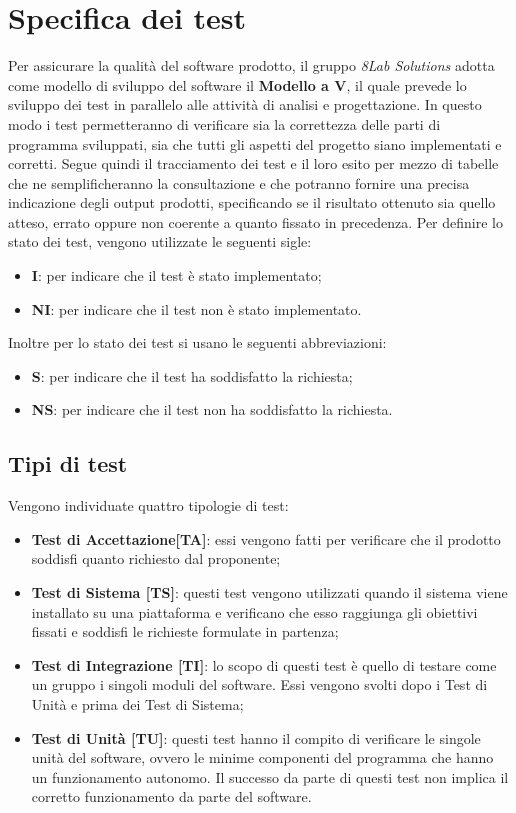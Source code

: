 \section{Specifica dei test}
Per assicurare la qualità del software prodotto, il gruppo \textit{8Lab
Solutions} adotta come modello di sviluppo del software il
\textbf{Modello a V\glo}, il quale prevede lo sviluppo dei test in parallelo alle
attività di analisi e progettazione. In questo modo i test permetteranno di
verificare sia la correttezza delle parti di programma sviluppati, sia che
tutti gli aspetti del progetto siano implementati e corretti. 
Segue quindi il tracciamento dei test e il loro esito per mezzo di tabelle che ne
semplificheranno la consultazione e che potranno fornire una precisa indicazione 
degli output prodotti, specificando se il risultato ottenuto sia quello atteso, errato
oppure non coerente a quanto fissato in precedenza.
Per definire lo stato dei test, vengono utilizzate le seguenti sigle:
\begin{itemize}
	\item \textbf{I}: per indicare che il test è stato implementato;
	\item \textbf{NI}: per indicare che il test non è stato implementato.
\end{itemize}
Inoltre per lo stato dei test si usano le seguenti abbreviazioni:
\begin{itemize}
	\item \textbf{S}: per indicare che il test ha soddisfatto la richiesta;
	\item \textbf{NS}: per indicare che il test non ha soddisfatto la richiesta.
\end{itemize}

\subsection{Tipi di test}
Vengono individuate quattro tipologie di test:
\begin{itemize}
	\item \textbf{Test di Accettazione[TA]}: essi vengono fatti per verificare 
		che il prodotto soddisfi quanto richiesto dal proponente;
	\item \textbf{Test di Sistema [TS]}: questi test vengono utilizzati quando il 
		sistema viene installato su una piattaforma e verificano che esso raggiunga gli 
		obiettivi fissati e soddisfi le richieste formulate in partenza;
	\item \textbf{Test di Integrazione [TI]}: lo scopo di questi test è quello di 
		testare come un gruppo i singoli moduli\glo{} del software. Essi vengono svolti 
		dopo i Test di Unità e prima dei Test di Sistema; 
	\item \textbf{Test di Unità [TU]}: questi test hanno il compito di verificare le 
		singole unità del software, ovvero le minime componenti del programma che hanno 
		un funzionamento autonomo. Il successo da parte di questi test non implica il 
		corretto funzionamento da parte del software.		
\end{itemize}

